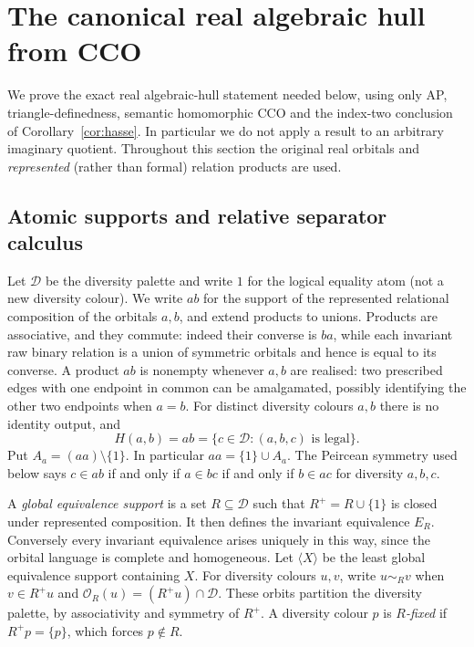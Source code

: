 \section{The canonical real algebraic hull from CCO}\label{sec:rawhull}

We prove the exact real algebraic-hull statement needed below, using
only AP, triangle-definedness, semantic homomorphic CCO and the index-two
conclusion of Corollary~\ref{cor:hasse}.  In particular we do not apply a
result to an arbitrary imaginary quotient. Throughout this section the
original real orbitals and \emph{represented} (rather than formal)
relation products are used.

\subsection{Atomic supports and relative separator calculus}

Let $\mathcal D$ be the diversity palette and write $1$ for the logical
equality atom (not a new diversity colour). We write $ab$ for the
support of the represented relational composition of the orbitals $a,b$,
and extend products to unions. Products are associative, and they commute:
indeed their converse is $ba$, while each invariant raw binary relation
is a union of symmetric orbitals and hence is equal to its converse.
A product $ab$ is nonempty whenever $a,b$ are realised: two prescribed
edges with one endpoint in common can be amalgamated, possibly identifying
the other two endpoints when $a=b$. For distinct diversity colours $a,b$
there is no identity output, and
\[
 H(a,b)=ab=\{c\in\mathcal D:(a,b,c)\text{ is legal}\}.
\]
Put $A_a=(aa)\setminus\{1\}$. In particular $aa=\{1\}\cup A_a$.
The Peircean symmetry used below says $c\in ab$ if and only if
$a\in bc$ if and only if $b\in ac$ for diversity $a,b,c$.

A \emph{global equivalence support} is a set $R\subseteq\mathcal D$
such that $R^+=R\cup\{1\}$ is closed under represented composition.
It then defines the invariant equivalence $E_R$. Conversely every
invariant equivalence arises uniquely in this way, since the orbital
language is complete and homogeneous.  Let $\langle X\rangle$ be the
least global equivalence support containing $X$. For diversity colours
$u,v$, write $u\sim_R v$ when $v\in R^+u$ and
$\mathcal O_R(u)=(R^+u)\cap\mathcal D$. These orbits partition the diversity
palette, by associativity and symmetry of $R^+$. A diversity colour $p$
is \emph{$R$-fixed} if $R^+p=\{p\}$, which forces $p\notin R$.

